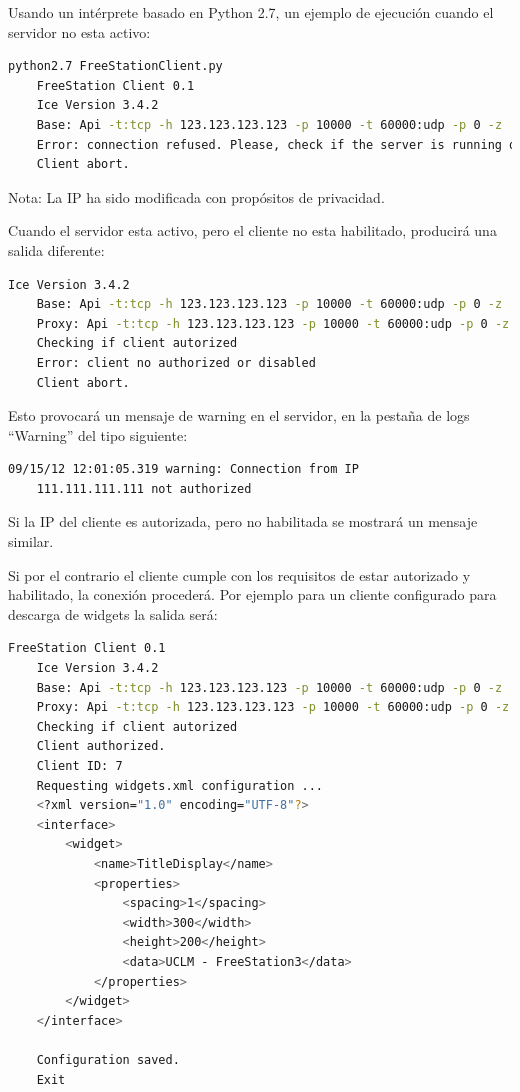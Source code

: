     Usando un intérprete basado en Python 2.7, un ejemplo de ejecución 
    cuando el servidor no esta activo:

    \begin{lstlisting}[language={bash}, texcl=false, caption={Ejemplo de
    conexión rechazada}] python2.7 FreeStationClient.py 
    FreeStation Client 0.1
    Ice Version 3.4.2
    Base: Api -t:tcp -h 123.123.123.123 -p 10000 -t 60000:udp -p 0 -z
    Error: connection refused. Please, check if the server is running or you are connecting properly.
    Client abort.
    \end{lstlisting}

    Nota: La IP ha sido modificada con propósitos de privacidad.
    
    Cuando el servidor esta activo, pero el cliente no esta habilitado,
    producirá una salida diferente:
    
    \begin{lstlisting}[language={bash}, texcl=false, caption={Ejemplo de
    conexión no autorizada}] Ice Version 3.4.2
    Base: Api -t:tcp -h 123.123.123.123 -p 10000 -t 60000:udp -p 0 -z
    Proxy: Api -t:tcp -h 123.123.123.123 -p 10000 -t 60000:udp -p 0 -z
    Checking if client autorized
    Error: client no authorized or disabled
    Client abort.
    \end{lstlisting}

    Esto provocará un mensaje de warning en el servidor, en la pestaña de logs
    ``Warning'' del tipo siguiente:
    
    \begin{lstlisting}[language={bash}, texcl=false, caption={Mensaje de
    cliente no autorizado}] 09/15/12 12:01:05.319 warning: Connection from IP
    111.111.111.111 not authorized
    \end{lstlisting}

    Si la IP del cliente es autorizada, pero no habilitada se mostrará un
    mensaje similar.
    
    Si por el contrario el cliente cumple con los requisitos de estar autorizado
    y habilitado, la conexión procederá. Por ejemplo para un cliente configurado
    para descarga de widgets la salida será:
    
    \begin{lstlisting}[language={bash}, texcl=false, caption={Conexión con
    éxito para extracción de widgets}] FreeStation Client 0.1
    Ice Version 3.4.2
    Base: Api -t:tcp -h 123.123.123.123 -p 10000 -t 60000:udp -p 0 -z
    Proxy: Api -t:tcp -h 123.123.123.123 -p 10000 -t 60000:udp -p 0 -z
    Checking if client autorized
    Client authorized.
    Client ID: 7
    Requesting widgets.xml configuration ...
    <?xml version="1.0" encoding="UTF-8"?>
    <interface>
        <widget>
            <name>TitleDisplay</name>
            <properties>
                <spacing>1</spacing>
                <width>300</width>
                <height>200</height>
                <data>UCLM - FreeStation3</data>
            </properties>
        </widget>
    </interface>
    
    Configuration saved.
    Exit
    \end{lstlisting}
    
